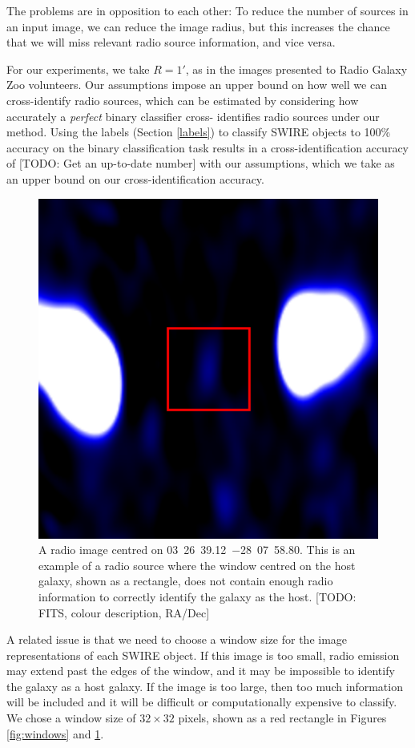 \documentclass[fleqn,usenatbib,usedcolumn]{mnras}
\begin{document}
    The problems are in opposition to each other: To reduce the number of
    sources in an input image, we can reduce the image radius, but this
    increases the chance that we will miss relevant radio source information,
    and vice versa.

    For our experiments, we take $R = 1'$, as in the images presented to Radio
    Galaxy Zoo volunteers. Our assumptions impose an upper bound on how well
    we can cross-identify radio sources, which can be estimated by considering
    how accurately a \emph{perfect} binary classifier cross- identifies radio
    sources under our method. Using the \citet{norris06} labels (Section
    \ref{labels}) to classify SWIRE objects to 100\% accuracy on the binary
    classification task results in a cross-identification accuracy of [TODO:
    Get an up-to-date number] with our assumptions, which we take as an upper
    bound on our cross-identification accuracy.

    \begin{figure}
      \centering
      \includegraphics[width=0.5\linewidth]{images/ARG0003sky_radio.eps}
      \caption{A radio image centred on 03~26~39.12~$-$28~07~58.80.
        This is an example of a radio source where the window centred on the
        host galaxy, shown as a rectangle, does not contain enough radio
        information to correctly identify the galaxy as the host. [TODO: FITS, colour description, RA/Dec]}
      \label{fig:broken-window-size}
    \end{figure}

    A related issue is that we need to choose a window size for the image
    representations of each SWIRE object. If this image is too small, radio
    emission may extend past the edges of the window, and it may be impossible
    to identify the galaxy as a host galaxy. If the image is too large, then
    too much information will be included and it will be difficult or
    computationally expensive to classify. We chose a window size of $32
    \times 32$ pixels, shown as a red rectangle in Figures
    \ref{fig:windows} and \ref{fig:broken-window-size}.
\end{document}
